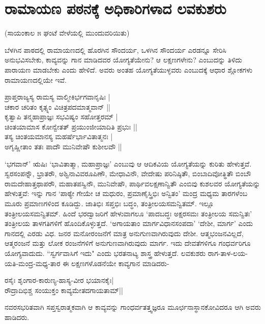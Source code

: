 \section*{ರಾಮಾಯಣ ಪಠನಕ್ಕೆ ಅಧಿಕಾರಿಗಳಾದ ಲವಕುಶರು} 

\begin{center} 
(ಸಾಯಂಕಾಲ ೫ ಘಂಟೆ ವೇಳೆಯಲ್ಲಿ ಮುಂದುವರಿಯಿತು) 
\end{center} 


ಬೆಳಗಿನ ಪಾಠದಲ್ಲಿ ರಾಮಾಯಣದಲ್ಲಿ ಹೊರಗಿನ ಸೌಂದರ್ಯ, ಒಳಗಿನ ಸೌಂದರ್ಯ ಎರಡನ್ನೂ ಸೇರಿಸಿ ಅನುಭವಿಸಬೇಕು, ಕಾವ್ಯವನ್ನು ಗಾನ ಮಾಡಿದವರ ಯೋಗ್ಯತೆಯೇನು? ಆ ಲಕ್ಷಣಗಳೇನು? ಎಂಬುದನ್ನು ತಿಳಿದು ಪಾರಾಯಣ ಮಾಡಬೇಕು ಎಂದು ಹೇಳಿದೆ. ಅವರು ಅಂತಹ ಯೋಗ್ಯತೆಯುಳ್ಳವರು ಎಂಬುದಕ್ಕೆ ಆಧಾರ ಶ್ಲೋಕಗಳು ರಾಮಾಯಣದಲ್ಲಿಯೇ ಇವೆ. 


\begin{shloka}
ಪ್ರಾಪ್ತರಾಜ್ಯಸ್ಯ ರಾಮಸ್ಯ ವಾಲ್ಮೀಕಿರ್ಭಗವಾನೃಷಿಃ |\\ 
ಚಕಾರ ಚರಿತಂ ಕೃತ್ಸ್ನಂ ವಿಚಿತ್ರಪದಮಾತ್ಮವಾನ್‍ ||\\ 
ಕೃತ್ವಾಪಿ ತನ್ಮಹಾಪ್ರಾಜ್ಞಃ ಸಭವಿಷ್ಯಂ ಸಹೋತ್ತರಮ್‍ |\\ 
ಚಿಂತಯಾಮಾಸ ಕೋನ್ವೇತತ್‍ ಪ್ರಯುಂಜೀಯಾದಿತಿ ಪ್ರಭುಃ ||\\ 
ತಸ್ಯ ಚಿಂತಯಮಾನಸ್ಯ ಮಹರ್ಷೆರ್ಭಾವಿತಾತ್ಮನಃ |\\ 
ಅಗೃಹ್ಣೀತಾಂ ತತಃ ಪಾದೌ ಮುನಿವೇಷೌ ಕುಶೀಲವೌ ||
\end{shloka}

`ಭಗವಾನ್‍' ಋಷಿಃ `ಭಾವಿತಾತ್ಮಾ, ಮಹಾಪ್ರಾಜ್ಞಃ' ಎಂಬುವು ಆ ಆದಿಕವಿಯ ಯೋಗ್ಯತೆಯನ್ನು ಕುರಿತು ಹೇಳುತ್ತವೆ. ಸ್ವರಸಂಪನ್ನೌ, ಭ್ರಾತರೌ, ಅಶ್ವಿನಾವಿವರೂಪಿಣೌ, ಮೇಧಾವಿನೌ, ವೇದೇಷು ಪರಿನಿಷ್ಠಿತೌ, ಬಿಂಬಾದಿವೋತ್ಥಿತೌ ಬಿಂಬೌ ರಾಮದೇಹಾತ್ತಥಾಪರೌ, ಮಹಾತಪಸ್ವಿನೌ, ಮುನಿವೇಷೌ, ಪಾರ್ಥಿವಲಕ್ಷಣಾನ್ವಿತೌ ಎಂಬಿವು ಕುಶಲವರ ಯೋಗ್ಯತೆಯನ್ನು ಹೇಳುತ್ತವೆ: ಇನ್ನು ಗಾನ `ಪಾಠ್ಯೇ ಗೇಯೇ ಚ ಮಧುರಂ, ಪ್ರಮಾಣೈಸ್ತ್ರಿಭಿಃ ಅನ್ವಿತಂ' ಮಂದ್ರ ಮಧ್ಯಮ ತಾರಗಳೆಂಬ ಮೂರು ಪ್ರಮಾಣಗಳಿಂದ ಕೂಡಿದ್ದು. ಜಾತಿಭಿಃ ಸಪ್ತಭಿಃ ಬದ್ಧಂ, ತಂತ್ರೀಲಯಸಮನ್ವಿತಮ್‍. ಇಲ್ಲೂ ತಂತ್ರೀಲಯಸಮನ್ವಿತಮ್‍. ಹಿಂದೆ ಭರದ್ವಾಜರಿಗೆ ಹೇಳುವಾಗಲೂ `ಪಾದಬದ್ಧಃ ಅಕ್ಷರಸಮಃ ತಂತ್ರೀಲಯ ಸಮನ್ವಿತಃ' ತಂತ್ರೀಲಯ ತಾಳಗತಿಗಳಿಗೆ ಹೊಂದಿಕೊಳ್ಳುತ್ತದೆ. `ಅಗಾಯತಾಂ ಮಾರ್ಗವಿಧಾನಸಂಪದಾ'\label{188} `ದೇಶೀ, ಮಾರ್ಗ' ಎಂದು ಗಾನದಲ್ಲಿ ಎರಡು ವಿಧ. ಜನರ ಮನೋರಂಜನೆಗೆ ಮಾತ್ರ ಅನುಗುಣವಾಗಿರುವುದು ದೇಶೀ. ಆತ್ಮಭಂಜನವಿಲ್ಲದೆ, ಆತ್ಮರಂಜನೆ ಮತ್ತು ಲೋಕ ರಂಜನೆಗಳಿಗೆ ಅನುಗುಣವಾಗಿರುವುದು ಮಾರ್ಗ. ಇದು ದೇವತೆಗಳಿಗೂ ಗಂಧರ್ವರಿಗೂ ಯೋಗ್ಯವಾದುದು. ``ಸ್ವರ್ಗವಾಸಿಗೆ ಇದು" ಎಂದು ಭರತನಾಟ್ಯ ಶಾಸ್ತ್ರ ಹೇಳುತ್ತದೆ. ಲವಕುಶರು ರಾಗ-ತಾಳ-ಲಯ-ಯತಿ-ಮಂದ್ರ-ಮಧ್ಯ-ತಾರ ಈ ಲಕ್ಷಣಗಳೊಡನೆಯೇ ಕಾವ್ಯಗಾನ ಮಾಡಿದರು- 

\begin{shloka} 
ರಸೈಃ ಶೃಂಗಾರ-ಕಾರುಣ್ಯ-ಹಾಸ್ಯ-ವೀರ ಭಯಾನಕೈಃ|\\ 
ರೌದ್ರಾದಿಭಿಶ್ಚ ಸಂಯುಕ್ತಂ ಕಾವ್ಯಮೇತದಗಾಯತಾಮ್‍||
\end{shloka}

ನವರಸಭರಿತವಾಗಿ ಸಪ್ತಸ್ವರಾತ್ಮಕವಾಗಿ ಆ ಕಾವ್ಯವನ್ನು ಗಾಂಧರ್ವತತ್ತ್ವಜ್ಞರೂ ಮೂರ್ಛನಾಸ್ಥಾನಕೋವಿದರೂ ಆಗಿ ಅವರು ಹಾಡಿದರು. 


